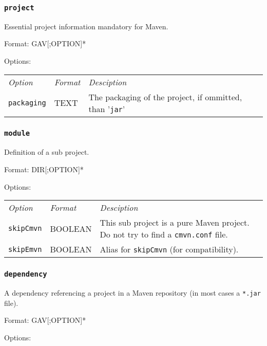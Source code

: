 \documentclass[a4paper,12pt,english,oneside,halfparskip]{scrartcl}
\newcommand{\code}[1]{\texttt{#1}}
\begin{document}
\subsubsection{\code{project}}

Essential project information mandatory for Maven.

Format: GAV[;OPTION]*

Options:

\begin{tabular}{lll}
\emph{Option} & \emph{Format} & \emph{Desciption} \\
\code{packaging} & TEXT & The packaging of the project, if ommitted, than '\code{jar}'
\end{tabular}


\subsubsection{\code{module}}

Definition of a sub project.

Format: DIR[;OPTION]*

Options:

\begin{tabular}{llp{}}
\emph{Option} & \emph{Format} & \emph{Desciption} \\
\code{skipCmvn} & BOOLEAN & This sub project is a pure Maven project. Do not try to find a \code{cmvn.conf} file. \\
\code{skipEmvn} & BOOLEAN & Alias for \code{skipCmvn} (for compatibility). \\
\end{tabular}

\subsubsection{\code{dependency}}

A dependency referencing a project in a Maven repository (in most cases a \code{*.jar} file).

Format: GAV[;OPTION]*

Options:
\end{document}

